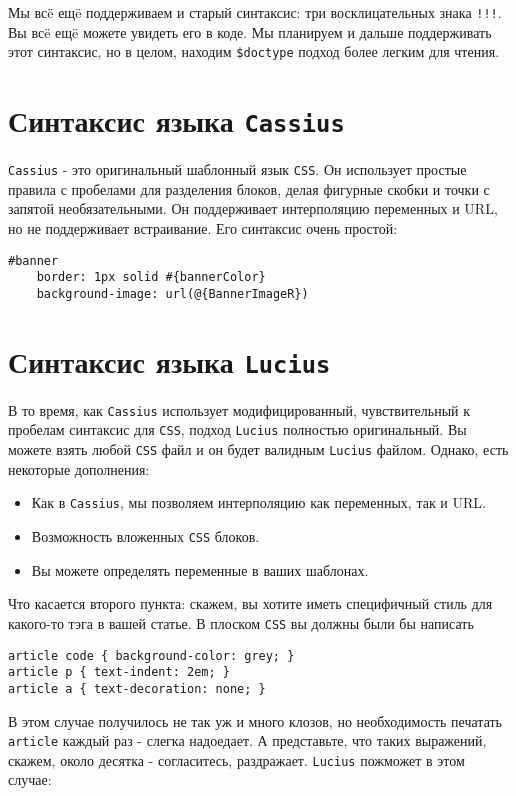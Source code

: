 Мы всë ещë поддерживаем и старый синтаксис: три восклицательных знака \texttt{!!!}.
Вы всë ещë можете увидеть его в коде. Мы планируем и дальше поддерживать этот
синтаксис, но в целом, находим \lstinline!$doctype! подход более легким для чтения.

\section{Синтаксис языка \texttt{Cassius}}
\texttt{Cassius} - это оригинальный шаблонный язык \texttt{CSS}. Он использует простые правила
с пробелами для разделения блоков, делая фигурные скобки и точки с запятой 
необязательными. Он поддерживает интерполяцию переменных и URL, но не поддерживает
встраивание. Его синтаксис очень простой:

\begin{lstlisting}
#banner
    border: 1px solid #{bannerColor}
    background-image: url(@{BannerImageR})
\end{lstlisting}

\section{Синтаксис языка \texttt{Lucius}}
В то время, как \texttt{Cassius} использует модифицированный, чувствительный к пробелам 
синтаксис для \texttt{CSS}, подход \texttt{Lucius} полностью оригинальный. Вы можете взять любой \texttt{CSS}
файл и он будет валидным \texttt{Lucius} файлом. Однако, есть некоторые дополнения:

\begin{itemize}
\item Как в \texttt{Cassius}, мы позволяем интерполяцию как переменных, так и URL.
\item Возможность вложенных \texttt{CSS} блоков.
\item Вы можете определять переменные в ваших шаблонах.
\end{itemize}

Что касается второго пункта: скажем, вы хотите иметь специфичный стиль для 
какого-то тэга в вашей статье. В плоском \texttt{CSS} вы должны были бы написать

\begin{lstlisting}
article code { background-color: grey; }
article p { text-indent: 2em; }
article a { text-decoration: none; }
\end{lstlisting}

В этом случае получилось не так уж и много клозов, но необходимость печатать
\texttt{article} каждый раз - слегка надоедает. А представьте, что таких выражений, 
скажем, около десятка - согласитесь, раздражает.
\texttt{Lucius} пожможет в этом случае:

